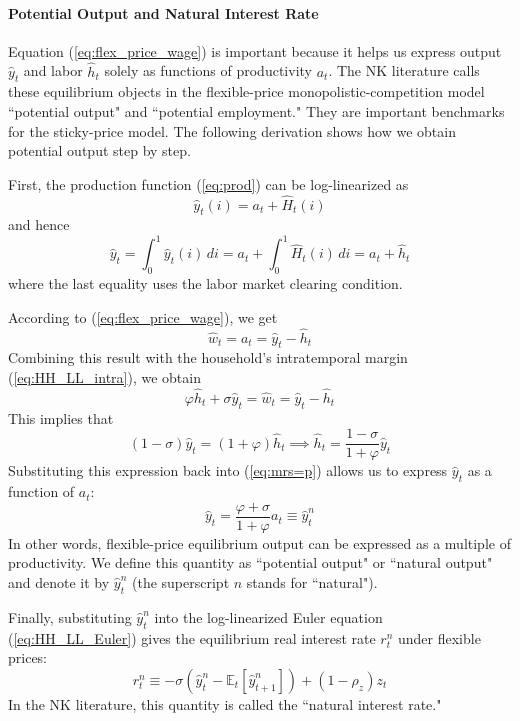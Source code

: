 \documentclass[12pt]{article}
\newcommand{\E}{\mathbb{E}}
\begin{document}
\paragraph{Potential Output and Natural Interest Rate \\ [6pt]}
Equation (\ref{eq:flex_price_wage}) is important because it helps us express output $\hat{y}_t$ and labor $\hat{h}_t$ solely as functions of productivity $a_t$. The NK literature calls these equilibrium objects in the flexible-price monopolistic-competition model ``potential output" and ``potential employment." They are important benchmarks for the sticky-price model. The following derivation shows how we obtain potential output step by step. 

First, the production function (\ref{eq:prod}) can be log-linearized as
\[\hat{y}_t(i) = a_t + \hat{H}_t(i)\]
and hence 
\begin{equation} \label{eq:flex_price_y_minus_h}
	\hat{y}_t = \int_0^1 \hat{y}_t(i) \, di = a_t + \int_0^1 \hat{H}_t(i)\, di = a_t + \hat{h}_t 
\end{equation}
where the last equality uses the labor market clearing condition.

According to (\ref{eq:flex_price_wage}), we get
\begin{equation*}
	\hat{w}_t = a_t = \hat{y}_t - \hat{h}_t
\end{equation*}
Combining this result with the household's intratemporal margin (\ref{eq:HH_LL_intra}), we obtain
\begin{equation} \label{eq:mrs=p}
	\varphi \hat{h}_t + \sigma \hat{y}_t = \hat{w}_t = \hat{y}_t - \hat{h}_t 
\end{equation} 
This implies that 
\[(1-\sigma) \hat{y}_t = (1 + \varphi) \hat{h}_t \implies \hat{h}_t = \frac{1-\sigma}{1+\varphi} \hat{y}_t\]
Substituting this expression back into (\ref{eq:mrs=p}) allows us to express $\hat{y}_t$ as a function of $a_t$:
\begin{equation} \label{eq:natural_output}
	\hat{y}_t = \frac{\varphi + \sigma}{1+\varphi} a_t \equiv \hat{y}_t^n
\end{equation}
In other words, flexible-price equilibrium output can be expressed as a multiple of productivity. We define this quantity as ``potential output" or ``natural output" and denote it by $\hat{y}_t^n$ (the superscript $n$ stands for ``natural").

Finally, substituting $\hat{y}_t^n$ into the log-linearized Euler equation (\ref{eq:HH_LL_Euler}) gives the equilibrium real interest rate $r_t^n$ under flexible prices:
\begin{equation} \label{eq:natural_rate}
	r_t^n \equiv -\sigma(\hat{y}_t^n - \E_t[\hat{y}_{t+1}^n]) + (1-\rho_z) z_t 
\end{equation}
In the NK literature, this quantity is called the ``natural interest rate."
\end{document}
